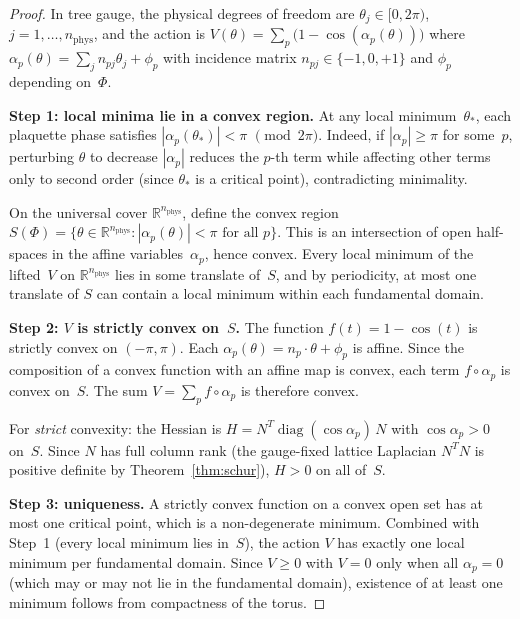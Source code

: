 \documentclass[11pt,a4paper]{article}
\theoremstyle{plain}
\theoremstyle{definition}
\theoremstyle{remark}
\newcommand{\R}{\mathbb{R}}
\begin{document}
\begin{proof}
In tree gauge, the physical degrees of freedom are
$\theta_j \in [0, 2\pi)$, $j = 1, \ldots, n_{\mathrm{phys}}$,
and the action is
$V(\theta) = \sum_p \bigl(1 - \cos(\alpha_p(\theta))\bigr)$
where $\alpha_p(\theta) = \sum_j n_{pj}\theta_j + \phi_p$
with incidence matrix $n_{pj} \in \{-1,0,+1\}$ and
$\phi_p$ depending on~$\Phi$.

\smallskip
\noindent\textbf{Step 1: local minima lie in a convex region.}
At any local minimum~$\theta_*$, each plaquette
phase satisfies $|\alpha_p(\theta_*)| < \pi$
$\pmod{2\pi}$.  Indeed, if $|\alpha_p| \geq \pi$
for some~$p$, perturbing $\theta$ to decrease $|\alpha_p|$
reduces the $p$-th term while affecting other terms
only to second order (since $\theta_*$ is a critical
point), contradicting minimality.

On the universal cover $\R^{n_{\mathrm{phys}}}$,
define the convex region
$S(\Phi) = \{\theta \in \R^{n_{\mathrm{phys}}} :
|\alpha_p(\theta)| < \pi \text{ for all } p\}$.
This is an intersection of open half-spaces in the
affine variables~$\alpha_p$, hence convex.
Every local minimum of the lifted~$V$ on
$\R^{n_{\mathrm{phys}}}$ lies in some translate
of~$S$, and by periodicity, at most one translate
of $S$ can contain a local minimum within each
fundamental domain.

\smallskip
\noindent\textbf{Step 2: $V$ is strictly convex on~$S$.}
The function $f(t) = 1 - \cos(t)$ is strictly convex
on $(-\pi, \pi)$.  Each $\alpha_p(\theta) =
n_p \cdot \theta + \phi_p$ is affine.  Since the
composition of a convex function with an affine map
is convex, each term
$f \circ \alpha_p$ is convex on~$S$.
The sum $V = \sum_p f \circ \alpha_p$ is therefore
convex.

For \emph{strict} convexity: the Hessian is
$H = N^T \operatorname{diag}(\cos\alpha_p)\, N$
with $\cos\alpha_p > 0$ on~$S$.
Since $N$ has full column rank (the gauge-fixed
lattice Laplacian $N^T N$ is positive definite by
Theorem~\ref{thm:schur}), $H > 0$ on all of~$S$.

\smallskip
\noindent\textbf{Step 3: uniqueness.}
A strictly convex function on a convex open set has
at most one critical point, which is a non-degenerate
minimum.  Combined with Step~1 (every local minimum
lies in~$S$), the action $V$ has exactly one local
minimum per fundamental domain.  Since $V \geq 0$
with $V = 0$ only when all $\alpha_p = 0$
(which may or may not lie in the fundamental domain),
existence of at least one minimum follows from
compactness of the torus.
\end{proof}
\end{document}
